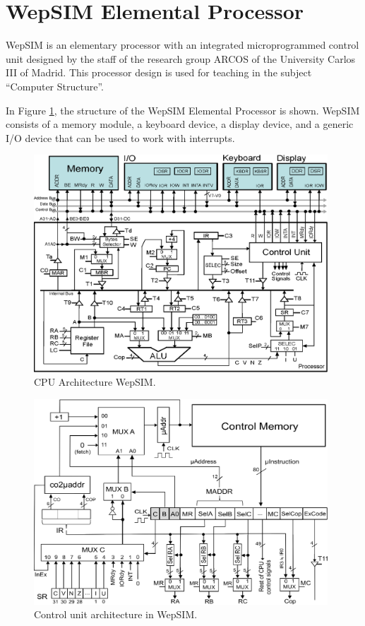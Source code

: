 \section*{WepSIM Elemental Processor}

WepSIM is an elementary processor with an integrated microprogrammed control unit designed by the staff of the research group ARCOS of the University Carlos III of Madrid. This processor design is used for teaching in the subject ``Computer Structure''.

In Figure \ref{fig:wepsimCPU_figure_summary}, the structure of the WepSIM Elemental Processor is shown. WepSIM consists of a memory module, a keyboard device, a display device, and a generic I/O device that can be used to work with interrupts.

\begin{figure}[htbp]
 	\centering
 	\includegraphics[width=11cm]{figures/processor6}
 	\caption{CPU Architecture WepSIM.}
	\label{fig:wepsimCPU_figure_summary}
\end{figure}

\begin{figure}[htbp]
 	\centering
 	\includegraphics[width=11cm]{figures/controlunit6}
 	\caption{Control unit architecture in WepSIM.}
	\label{fig:wepsimCU_figure_summary}
\end{figure}


